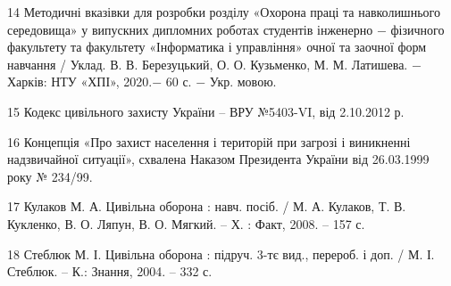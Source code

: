 14 Методичні вказівки для розробки розділу «Охорона праці та навколишнього середовища» у випускних дипломних роботах студентів інженерно $-$ фізичного факультету та факультету «Інформатика і управління» очної та заочної форм навчання / Уклад. В. В. Березуцький, О. О. Кузьменко, М. М. Латишева. $-$ Харків: НТУ «ХПІ», 2020.$-$ 60 с. $-$ Укр. мовою.

15 Кодекс цивільного захисту України – ВРУ №5403-VI, від 2.10.2012 р.

16 Концепція «Про захист населення і територій при загрозі і виникненні надзвичайної ситуації», схвалена Наказом Президента України від 26.03.1999 року № 234/99.

17 Кулаков М. А. Цивільна оборона : навч. посіб. / М. А. Кулаков, Т. В. Кукленко, В. О. Ляпун, В. О. Мягкий. – Х. : Факт, 2008. – 157 с.

18 Стеблюк М. І. Цивільна оборона  : підруч. 3-тє вид., перероб. і доп. / М. І. Стеблюк. – К.: Знання, 2004. – 332 с.
